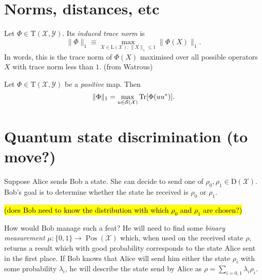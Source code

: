 \documentclass[a4paper]{report}
\newcommand{\calY}{{\mathcal{Y}}}
\newcommand{\calS}{{\mathcal{S}}}
\newcommand{\calX}{{\mathcal{X}}}
\newcommand{\rmD}{{\mathrm{D}}}
\newcommand{\rmL}{{\mathrm{L}}}
\newcommand{\rmT}{{\mathrm{T}}}
\DeclareMathOperator{\Pos}{Pos}
\begin{document}
\section{Norms, distances, etc}

\begin{defn}
	Let $\Phi\in\rmT(\calX,\calY)$. Its \emph{induced trace norm} is
	\begin{equation}
		\|\Phi\|_1 \equiv \max_{X\in\rmL(\calX): \|X\|_1\le 1}\|\Phi(X)\|_1.
	\end{equation}
	In words, this is the trace norm of $\Phi(X)$ maximised over all possible operators $X$ with trace norm less than $1$. (from Watrous)
\end{defn}

\begin{prop}
	Let $\Phi\in\rmT(\calX,\calY)$ be a \emph{positive} map. Then
	\begin{equation}
		\|\Phi\|_1 = \max_{u\in\calS(\calX)}\Tr[\Phi(uu^*)].
	\end{equation}
\end{prop}

\section{Quantum state discrimination (to move?)}

Suppose Alice sends Bob a state. She can decide to send one of $\rho_0,\rho_1\in\rmD(\calX)$. Bob's goal is to determine whether the state he received is $\rho_0$ or $\rho_1$.

\hl{(does Bob need to know the distribution with which $\rho_0$ and $\rho_1$ are chosen?)}

How would Bob manage such a feat? He will need to find some \emph{binary measurement} $\mu:\{0,1\}\to\Pos(\calX)$ which, when used on the received state $\rho$, returns a result which with good probability corresponds to the state Alice sent in the first place.
If Bob knows that Alice will send him either the state $\rho_i$ with some probability $\lambda_i$, he will describe the state send by Alice as
$\rho = \sum_{i=0,1} \lambda_i \rho_i$.
\end{document}
